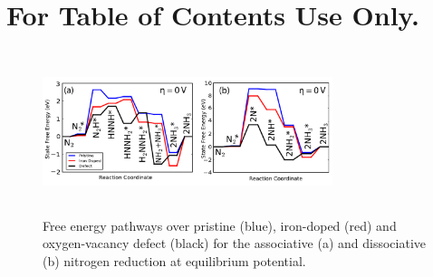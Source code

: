 \documentclass[journal=ascecg,manuscript=article,articletitle=true]{achemso}
\begin{document}
\section{For Table of Contents Use Only.}
\begin{figure}

\includegraphics[width=8.47cm,height=4.76cm,]{figures/defect_effects.pdf}
\caption{Free energy pathways over pristine (blue), iron-doped (red) and oxygen-vacancy defect (black) for the associative (a) and dissociative (b) nitrogen reduction at equilibrium potential.}
\label{fig:defect_effects}
\end{figure}
\end{document}
